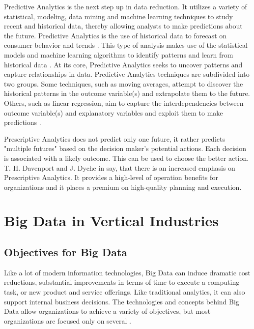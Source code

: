 \documentclass[runningheads]{llncs}
\begin{document}
Predictive Analytics is the next step up in data reduction. It utilizes a variety of statistical, modeling, data mining and machine learning techniques to study recent and historical data, thereby allowing analysts to make predictions about the future\cite{CHARTER}. Predictive Analytics is the use of historical data to forecast on consumer behavior and trends \cite{TALLIN}. This type of analysis makes use of the statistical models and machine learning algorithms to identify patterns and learn from historical data \cite{MIS}. At its core, Predictive Analytics seeks to uncover patterns and capture relationships in data. Predictive Analytics techniques are subdivided into two groups. Some techniques, such as moving averages, attempt to discover the historical patterns in the outcome variable(s) and extrapolate them to the future. Others, such as linear regression, aim to capture the interdependencies between outcome variable(s) and explanatory variables and exploit them to make predictions \cite{ELS}.

Prescriptive Analytics does not predict only one future, it rather predicts "multiple futures" based on the decision maker's potential actions. Each decision is associated with a likely outcome. This can be used to choose the better action. T. H. Davenport and J. Dyche in \cite{DAVENPORT} say, that there is an increased emphasis on Prescriptive Analytics. It provides a high-level of operation benefits for organizations and it places a premium on high-quality planning and execution. 

\section{Big Data in Vertical Industries}
\subsection{Objectives for Big Data}
Like a lot of modern information technologies, Big Data can induce dramatic cost reductions, substantial improvements in terms of time  to execute a computing task, or new product and service offerings. Like traditional analytics, it can also support internal business decisions. The technologies and concepts behind Big Data allow organizations to achieve a variety of objectives, but most organizations are focused only on several \cite{DAVENPORT}.
\end{document}
